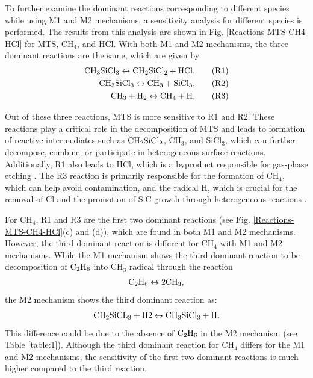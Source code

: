 \documentclass[final, letterpaper, square, comma, numbers, sort&compress]{elsarticle}
\begin{document}
To further examine the dominant reactions corresponding to different species while using M1 and M2 mechanisms, a sensitivity analysis for different species is performed. The results from this analysis are shown in Fig. \ref{Reactions-MTS-CH4-HCl} for MTS, CH$_4$, and HCl. With both M1 and M2 mechanisms, the three dominant reactions are the same, which are given by
\begin{align} %
    \rm CH_3SiCl_3 \leftrightarrow CH_2SiCl_2 + HCl, & \tag{R1} \\
    \rm CH_3SiCl_3 \leftrightarrow CH_3 + SiCl_3, & \tag{R2} \\
    \rm CH_3 + H_2 \leftrightarrow CH_4 + H, & \tag{R3}
\end{align}

\noindent Out of these three reactions, MTS is more sensitive to R1 and R2. These reactions play a critical role in the decomposition of MTS and leads to formation of reactive intermediates such as $\rm CH_2SiCl_2$, CH$_3$, and SiCl$_3$, which can further decompose, combine, or participate in heterogeneous surface reactions. Additionally, R1 also leads to HCl, which is a byproduct responsible for gas-phase etching \cite{Wang2008,Guan2020}. The R3 reaction is primarily responsible for the formation of CH$_4$, which can help avoid contamination, and the radical H, which is crucial for the removal of Cl and the promotion of SiC growth through heterogeneous reactions \cite{Brennan1990}. 

For CH$_4$, R1 and R3 are the first two dominant reactions (see Fig. \ref{Reactions-MTS-CH4-HCl}(c) and (d)), which are found in both M1 and M2 mechanisms. However, the third dominant reaction is different for CH$_4$ with M1 and M2 mechanisms. While the M1 mechanism shows the third dominant reaction to be decomposition of $\rm C_2H_6$ into CH$_3$ radical through the reaction
\begin{align*}
    \rm C_2H_6 \leftrightarrow 2CH_3,
\end{align*}
the M2 mechanism shows the third dominant reaction as:
\begin{align*}
    \rm CH_2SiCL_3 + H2 \leftrightarrow CH_3SiCl_3 + H.
\end{align*}
This difference could be due to the absence of $\rm C_2H_6$ in the M2 mechanism (see Table \ref{table:1}). Although the third dominant reaction for CH$_4$ differs for the M1 and M2 mechanisms, the sensitivity of the first two dominant reactions is much higher compared to the third reaction.
\end{document}
